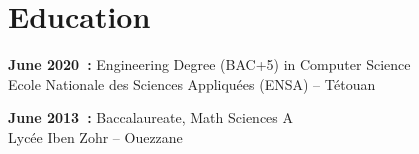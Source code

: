 \section*{Education}

\noindent\textbf{June 2020~:} Engineering Degree (BAC+5) in Computer Science\\
Ecole Nationale des Sciences Appliquées (ENSA) -- Tétouan

\vspace{4pt}
\noindent\textbf{June 2013~:} Baccalaureate, Math Sciences A\\
Lycée Iben Zohr -- Ouezzane
